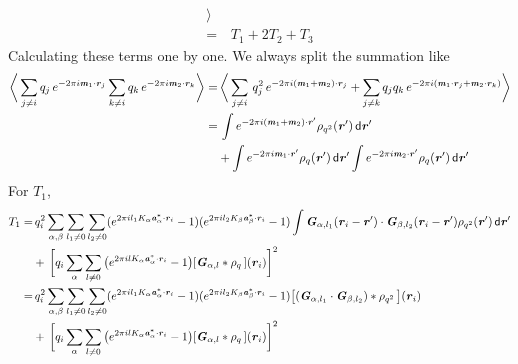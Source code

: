 \documentclass[aps,pre,preprint]{revtex4}
\renewcommand{\v}[1]{\textbf{\textit{#1}}}
\renewcommand{\d}[1]{\textsf{#1}}
\begin{document}
\begin{align}
  \bigg\rangle\\ \nonumber
  = &\, T_1 + 2T_2 + T_3
\end{align}
Calculating these terms one by one. We always split the summation like
\begin{align}\nonumber
  \bigg\langle
  \sum_{j\neq i}q_j\,e^{-2\pi i\v m_1\cdot\v r_j}
  \sum_{k\neq i}q_k\,e^{-2\pi i\v m_2\cdot\v r_k}
  \bigg\rangle
  = &\,
  \bigg\langle
  \sum_{j\neq i}\,q_j^2\,e^{-2\pi i(\v m_1 + \v m_2)\cdot\v r_j} +
  \sum_{j\neq k}q_jq_k\,e^{-2\pi i(\v m_1\cdot\v r_j + \v m_2\cdot\v r_k)}
  \bigg\rangle\\ \nonumber
  = &\,
  \int
  e^{-2\pi i(\v m_1 + \v m_2)\cdot\v r'} \rho_{q^2}(\v r')\,\d d\v r'\\
  &+
  \int e^{-2\pi i\v m_1\cdot\v r'} \rho_q(\v r')\,\d d\v r'
  \int e^{-2\pi i\v m_2\cdot\v r'} \rho_q(\v r')\,\d d\v r'
\end{align}
For $T_1$,
\begin{align}\nonumber
  T_1
  =  &\,
  q_i^2
  \sum_{\alpha,\beta} \sum_{l_1\neq 0}\sum_{l_2\neq 0}
  (e^{2\pi i l_1K_\alpha\v a^\ast_\alpha\cdot\v r_i} - 1)
  (e^{2\pi i l_2K_\beta\v a^\ast_\beta\cdot\v r_i} - 1)
  \int
  \v G_{\alpha,l_1}(\v r_i - \v r')\cdot\v G_{\beta,l_2}(\v r_i - \v r')
  \rho_{q^2}(\v r')
  \,\d d\v r' \\ \nonumber
  &+ \,
  \bigg[
  q_i \sum_{\alpha}\sum_{l\neq 0}
  \big(
  e^{2\pi ilK_\alpha\v a_\alpha^\ast\cdot\v r_i} - 1
  \big)
  [\v G_{\alpha,l}\ast\rho_q\,] (\v r_i)
  \bigg]^2 \\ \nonumber
  = &\,
  q_i^2
  \sum_{\alpha,\beta} \sum_{l_1\neq 0}\sum_{l_2\neq 0}
  (e^{2\pi i l_1K_\alpha\v a^\ast_\alpha\cdot\v r_i} - 1)
  (e^{2\pi i l_2K_\beta\v a^\ast_\beta\cdot\v r_i} - 1)
  \big[
  (\v G_{\alpha,l_1}\cdot\v G_{\beta,l_2})\ast \rho_{q^2}\,
  \big] (\v r_i) \\
  &+ \,
  \bigg[
  q_i \sum_{\alpha}\sum_{l\neq 0}
  \big(
  e^{2\pi ilK_\alpha\v a_\alpha^\ast\cdot\v r_i} - 1
  \big)
  [\v G_{\alpha,l}\ast\rho_q\,] (\v r_i)
  \bigg]^2 
\end{align}
\end{document}
